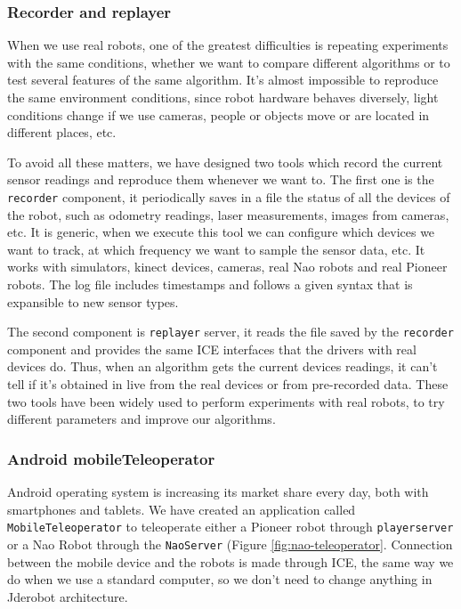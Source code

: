 \documentclass[twocolumn]{svjour3}          %
\begin{document}
\subsubsection{Recorder and replayer}

When we use real robots, one of the greatest difficulties is repeating experiments with the same conditions, whether we want to compare different algorithms or to test several features of the same algorithm. It's almost impossible to reproduce the same environment conditions, since robot hardware behaves diversely, light conditions change if we use cameras, people or objects move or are located in different places, etc.

To avoid all these matters, we have designed two tools which record the current sensor readings and reproduce them whenever we want to. The first one is the \texttt{recorder} component, it periodically saves in a file the status of all the devices of the robot, such as odometry readings, laser measurements, images from cameras, etc. It is generic, when we execute this tool we can configure which devices we want to track, at which frequency we want to sample the sensor data, etc. It works with simulators, kinect devices, cameras, real Nao robots and real Pioneer robots. The log file includes timestamps and follows a given syntax that is expansible to new sensor types.

The second component is \texttt{replayer} server, it reads the file saved by the \texttt{recorder} component and provides the same ICE interfaces that the drivers with real devices do. Thus, when an algorithm gets the current devices readings, it can't tell if it's obtained in live from the real devices or from pre-recorded data. These two tools have been widely used to perform experiments with real robots, to try different parameters and improve our algorithms.

\subsubsection{Android mobileTeleoperator}

Android operating system is increasing its market share every day, both with smartphones and tablets. 
We have created an application called \texttt{MobileTeleoperator} to teleoperate either a Pioneer robot through \texttt{playerserver} or a Nao Robot through the \texttt{NaoServer} (Figure \ref{fig:nao-teleoperator}. Connection between the mobile device and the robots is made through ICE, the same way we do when we use a standard computer, so we don't need to change anything in Jderobot architecture.
\end{document}

